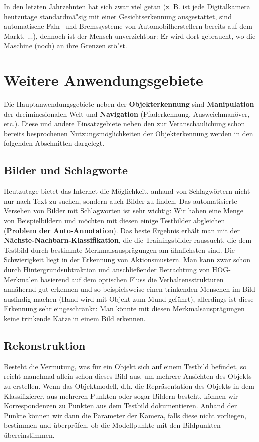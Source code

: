 In den letzten Jahrzehnten hat sich zwar viel getan (z. B. ist jede Digitalkamera heutzutage standardmä"sig mit einer Gesichtserkennung ausgestattet, sind automatische Fahr- und Bremssysteme von Automobilherstellern bereits auf dem Markt, ...), dennoch ist der Mensch unverzichtbar: Er wird dort gebraucht, wo die Maschine (noch) an ihre Grenzen stö"st.

\section{Weitere Anwendungsgebiete}
Die Hauptanwendungsgebiete neben der \textbf{Objekterkennung} sind \textbf{Manipulation} der dreiminesionalen Welt und \textbf{Navigation} (Pfaderkennung, Ausweichmanöver, etc.). Diese und andere Einsatzgebiete neben den zur Veranschaulichung schon bereits besprochenen Nutzungsmöglichkeiten der Objekterkennung werden in den folgenden Abschnitten dargelegt.


\subsection{Bilder und Schlagworte}
Heutzutage bietet das Internet die Möglichkeit, anhand von Schlagwörtern nicht nur nach Text zu suchen, sondern auch Bilder zu finden. Das automatisierte Versehen von Bilder mit Schlagworten ist sehr wichtig: Wir haben eine Menge von Beispielbildern und möchten mit diesen einige Testbilder abgleichen (\textbf{Problem der Auto-Annotation}). Das beste Ergebnis erhält man mit der \textbf{Nächste-Nachbarn-Klassifikation}, die die Trainingsbilder raussucht, die dem Testbild durch bestimmte Merkmalsausprägungen am ähnlichsten sind. Die Schwierigkeit liegt in der Erkennung von Aktionsmustern. Man kann zwar schon durch Hintergrundsubtraktion und anschließender Betrachtung von HOG-Merkmalen basierend auf dem optischen Fluss die Verhaltensstrukturen annähernd gut erkennen und so beispielsweise einen trinkenden Menschen im Bild ausfindig machen (Hand wird mit Objekt zum Mund geführt), allerdings ist diese Erkennung sehr eingeschränkt: Man könnte mit diesen Merkmalsausprägungen keine trinkende Katze in einem Bild erkennen.


\subsection{Rekonstruktion}
Besteht die Vermutung, was für ein Objekt sich auf einem Testbild befindet, so reicht manchmal allein schon dieses Bild aus, um mehrere Ansichten des Objekts zu erstellen. Wenn das Objektmodell, d.h. die Repräsentation des Objekts in dem Klassifizierer, aus mehreren Punkten oder sogar Bildern besteht, können wir Korrespondenzen zu Punkten aus dem Testbild dokumentieren. Anhand der Punkte können wir dann die Parameter der Kamera, falls diese nicht vorliegen, bestimmen und überprüfen, ob die Modellpunkte mit den Bildpunkten übereinstimmen.

